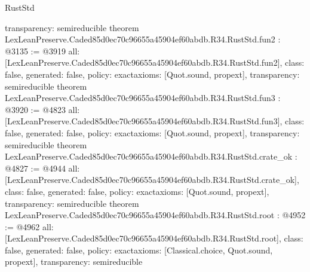 \begin{lexlean}{RustStd}
\begin{coremodule}
{  transparency: semireducible
}
theorem LexLeanPreserve.Caded85d0ec70c96655a45904ef60abdb.R34.RustStd.fun2 : @3135 := @3919 {
  all: [LexLeanPreserve.Caded85d0ec70c96655a45904ef60abdb.R34.RustStd.fun2],
  class: false,
  generated: false,
  policy: exact{axioms: [Quot.sound, propext]},
  transparency: semireducible
}
theorem LexLeanPreserve.Caded85d0ec70c96655a45904ef60abdb.R34.RustStd.fun3 : @3920 := @4823 {
  all: [LexLeanPreserve.Caded85d0ec70c96655a45904ef60abdb.R34.RustStd.fun3],
  class: false,
  generated: false,
  policy: exact{axioms: [Quot.sound, propext]},
  transparency: semireducible
}
theorem LexLeanPreserve.Caded85d0ec70c96655a45904ef60abdb.R34.RustStd.crate_ok : @4827 := @4944 {
  all: [LexLeanPreserve.Caded85d0ec70c96655a45904ef60abdb.R34.RustStd.crate_ok],
  class: false,
  generated: false,
  policy: exact{axioms: [Quot.sound, propext]},
  transparency: semireducible
}
theorem LexLeanPreserve.Caded85d0ec70c96655a45904ef60abdb.R34.RustStd.root : @4952 := @4962 {
  all: [LexLeanPreserve.Caded85d0ec70c96655a45904ef60abdb.R34.RustStd.root],
  class: false,
  generated: false,
  policy: exact{axioms: [Classical.choice, Quot.sound, propext]},
  transparency: semireducible
}


\end{coremodule}
\end{lexlean}
